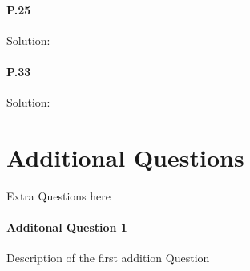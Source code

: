 \documentclass[12pt]{article}
\begin{document}
                                                                                                                                             
\paragraph{P.25}                                                                                                                                                     
Solution:                                                                                                                                                            
\paragraph{P.33}                                                                                                                                                     
Solution:

\section{Additional Questions}
Extra Questions here

\paragraph{Additonal Question 1}
Description of the first addition Question
\end{document}
